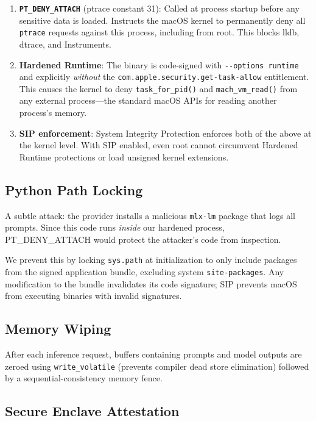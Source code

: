 \documentclass[10pt,twocolumn,letterpaper]{article}
\begin{document}
\begin{enumerate}[leftmargin=*,itemsep=1pt,topsep=2pt]
    \item \textbf{\texttt{PT\_DENY\_ATTACH}} (ptrace constant 31): Called at process startup before any sensitive data is loaded. Instructs the macOS kernel to permanently deny all \texttt{ptrace} requests against this process, including from root. This blocks lldb, dtrace, and Instruments.
    \item \textbf{Hardened Runtime}: The binary is code-signed with \texttt{-{}-options runtime} and explicitly \emph{without} the \texttt{com.apple.security.get-task-allow} entitlement. This causes the kernel to deny \texttt{task\_for\_pid()} and \texttt{mach\_vm\_read()} from any external process---the standard macOS APIs for reading another process's memory.
    \item \textbf{SIP enforcement}: System Integrity Protection enforces both of the above at the kernel level. With SIP enabled, even root cannot circumvent Hardened Runtime protections or load unsigned kernel extensions.
\end{enumerate}

\subsection{Python Path Locking}

A subtle attack: the provider installs a malicious \texttt{mlx-lm} package that logs all prompts. Since this code runs \emph{inside} our hardened process, PT\_DENY\_ATTACH would protect the attacker's code from inspection.

We prevent this by locking \texttt{sys.path} at initialization to only include packages from the signed application bundle, excluding system \texttt{site-packages}. Any modification to the bundle invalidates its code signature; SIP prevents macOS from executing binaries with invalid signatures.

\subsection{Memory Wiping}

After each inference request, buffers containing prompts and model outputs are zeroed using \texttt{write\_volatile} (prevents compiler dead store elimination) followed by a sequential-consistency memory fence.

\subsection{Secure Enclave Attestation}
\end{document}
